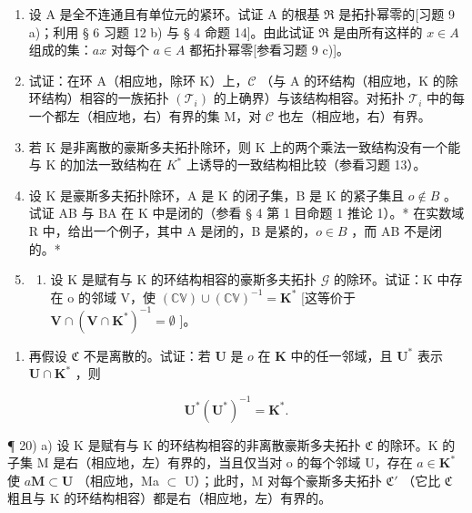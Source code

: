 \begin{enumerate}
\def\labelenumi{\arabic{enumi})}
\setcounter{enumi}{14}
\item
  设 A 是全不连通且有单位元的紧环。试证 A 的根基 \(\Re\) 是拓扑幂零的{[}习题 9 a)；利用 § 6 习题 12 b) 与 § 4 命题 14{]}。由此试证 \(\Re\) 是由所有这样的 \(x \in A\) 组成的集：\(ax\) 对每个 \(a \in A\) 都拓扑幂零{[}参看习题 9 c){]}。
\item
  试证：在环 A（相应地，除环 K）上，\(\mathcal{C}\) （与 A 的环结构（相应地，K 的除环结构）相容的一族拓扑 \((\mathcal{T}_i)\) 的上确界）与该结构相容。对拓扑 \(\mathcal{T}_i\) 中的每一个都左（相应地，右）有界的集 M，对 \(\mathcal{C}\) 也左（相应地，右）有界。
\item
  若 K 是非离散的豪斯多夫拓扑除环，则 K 上的两个乘法一致结构没有一个能与 K 的加法一致结构在 \(K^{*}\) 上诱导的一致结构相比较（参看习题 13）。
\item
  设 K 是豪斯多夫拓扑除环，A 是 K 的闭子集，B 是 K 的紧子集且 \(o \notin B\) 。试证 AB 与 BA 在 K 中是闭的（参看 § 4 第 1 目命题 1 推论 1）。* 在实数域 R 中，给出一个例子，其中 A 是闭的，B 是紧的，\(o \in B\) ，而 AB 不是闭的。*
\item
  \begin{enumerate}
  \def\labelenumii{\alph{enumii})}
  \tightlist
  \item
    设 K 是赋有与 K 的环结构相容的豪斯多夫拓扑 \(\mathcal{G}\) 的除环。试证：K 中存在 o 的邻域 V，使 \((\mathbb{CV}) \cup (\mathbb{CV})^{-1} = \mathbf{K}^*\) {[}这等价于 \(\mathbf{V} \cap (\mathbf{V} \cap \mathbf{K}^*)^{-1} = \emptyset\) {]}。
  \end{enumerate}
\end{enumerate}

\begin{enumerate}
\def\labelenumi{\alph{enumi})}
\setcounter{enumi}{1}
\tightlist
\item
  再假设 \(\mathfrak{C}\) 不是离散的。试证：若 \(\mathbf{U}\) 是 \(o\) 在 \(\mathbf{K}\) 中的任一邻域，且 \(\mathbf{U}^*\) 表示 \(\mathbf{U} \cap \mathbf{K}^*\) ，则
\end{enumerate}

\[
\mathbf {U} ^ {*} (\mathbf {U} ^ {*}) ^ {- 1} = \mathbf {K} ^ {*}.
\]

¶ 20) a) 设 K 是赋有与 K 的环结构相容的非离散豪斯多夫拓扑 \(\mathfrak{C}\) 的除环。K 的子集 M 是右（相应地，左）有界的，当且仅当对 o 的每个邻域 U，存在 \(a \in \mathbf{K}^*\) 使 \(a\mathbf{M} \subset \mathbf{U}\) （相应地，Ma \(\subset\) U）；此时，M 对每个豪斯多夫拓扑 \(\mathfrak{C}'\) （它比 \(\mathfrak{C}\) 粗且与 K 的环结构相容）都是右（相应地，左）有界的。

